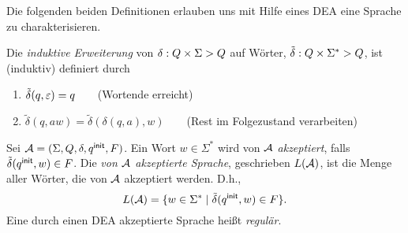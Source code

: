 \begin{center}
\end{center}

Die folgenden beiden Definitionen erlauben uns mit Hilfe eines \acs*{DEA} eine Sprache zu charakterisieren.
\begin{Def}[name={[Induktive erweiterung von $\delta$ auf Wörter]}]\label{def:2.deltaschlange}
        Die \emph{induktive Erweiterung} von $\delta:Q\times\Sigma\->Q$ auf Wörter, $\tilde{\delta}: Q\times\Sigma^*\->Q$, ist (induktiv) definiert durch
  \begin{enumerate}
  \item $\tilde\delta(q,\varepsilon) =q$\ \ \ \  (Wortende erreicht)
  \item $\tilde\delta(q,aw)=\tilde\delta(\delta(q,a),w)$\ \ \ \ (Rest im Folgezustand verarbeiten)
  \qedhere
  \end{enumerate}
\end{Def}
\begin{Def}[name={[Die durch einen \acs*{DEA} akzeptierte Sprache]}]\label{def:2.sprache}
        Sei $\mathcal{A}=(\Sigma, Q,\delta,q^\mathsf{init},F)$. 
        Ein Wort $w\in\Sigma^*$ wird von $\mathcal{A}$ \emph{akzeptiert}, falls $\tilde\delta(q^\mathsf{init},w)\in F$.
        Die \emph{von $\mathcal{A}$ akzeptierte Sprache}, geschrieben $L(\mathcal{A})$, ist die Menge aller Wörter, die von $\mathcal{A}$ akzeptiert werden. D.h., 
        \[ L(\mathcal{A}) = \{ w\in\Sigma^* \mid \tilde\delta(q^\mathsf{init},w)\in F \}. \]
        Eine durch einen \acs*{DEA} akzeptierte Sprache heißt \emph{regulär}.
\end{Def}


